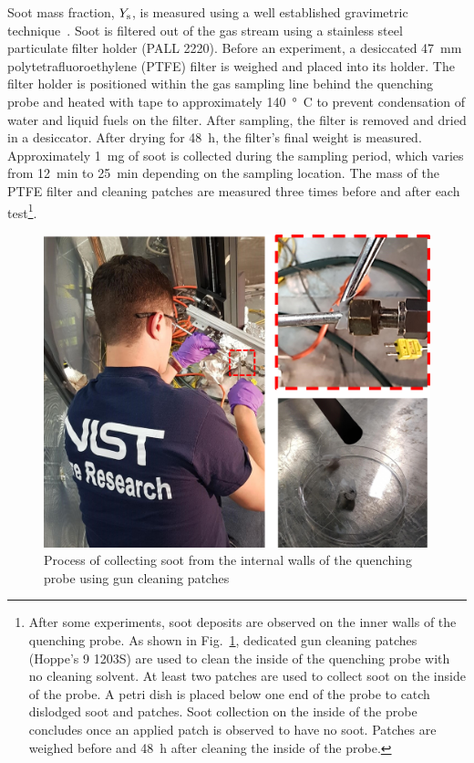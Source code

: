 \documentclass[12pt]{article}
\begin{document}
Soot mass fraction, $Y_{\rm s}$, is measured using a well established gravimetric technique~\cite{Choi1995}. Soot is filtered out of the gas stream using a stainless steel particulate filter holder (PALL 2220).  Before an experiment, a desiccated \SI{47}{mm} polytetrafluoroethylene (PTFE) filter is weighed and placed into its holder. The filter holder is positioned within the gas sampling line behind the quenching probe and heated with tape to approximately \SI{140}{\degree C} to prevent condensation of water and liquid fuels on the filter. After sampling, the filter is removed and dried in a desiccator. After drying for 48~h, the filter’s final weight is measured. Approximately \SI{1}{mg} of soot is collected during the sampling period, which varies from 12~min to 25~min depending on the sampling location. The mass of the PTFE filter and cleaning patches are measured three times before and after each test\footnote{After some experiments, soot deposits are observed on the inner walls of the quenching probe. As shown in Fig.~\ref{fig:Soot_Probe_Setup}, dedicated gun cleaning patches (Hoppe's 9 1203S) are used to clean the inside of the quenching probe with no cleaning solvent. At least two patches are used to collect soot on the inside of the probe. A petri dish is placed below one end of the probe to catch dislodged soot and patches. Soot collection on the inside of the probe concludes once an applied patch is observed to have no soot. Patches are weighed before and 48~h after cleaning the inside of the probe.}.

\begin{figure}[ht!]
	\centering
\includegraphics[width=15.0cm,keepaspectratio]{Soot_Probe.png}
	\caption[Process for cleaning soot probe]{Process of collecting soot from the internal walls of the quenching probe using gun cleaning patches}
	\label{fig:Soot_Probe_Setup}
\end{figure}
\end{document}
